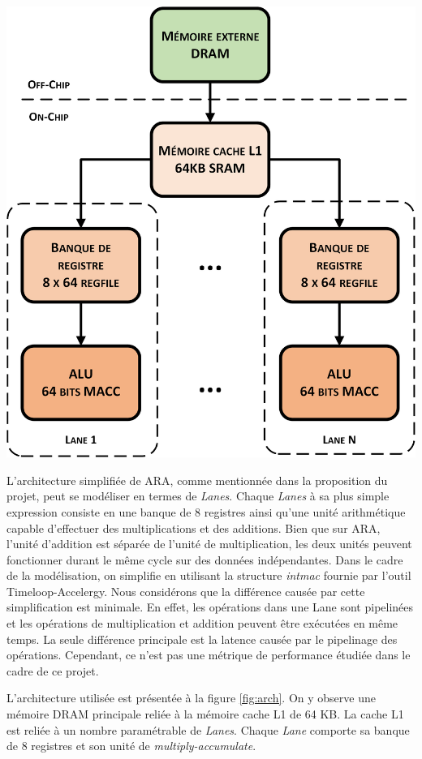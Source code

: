 \documentclass[10pt,letterpaper]{article}
\begin{document}
\begin{multicols}{2}
    {\centering
    \includegraphics[width=0.8\linewidth]{arch_visio.png}
    \label{fig:arch}}
    \bigskip

    L'architecture simplifiée de ARA, comme mentionnée dans la proposition du projet, peut se modéliser en termes de 
    \textit{Lanes}. Chaque \textit{Lanes} à sa plus simple expression consiste en une banque de 8 registres ainsi qu'une
    unité arithmétique capable d'effectuer des multiplications et des additions. Bien que sur ARA, l'unité d'addition 
    est séparée de l'unité de multiplication, les deux unités peuvent fonctionner durant le même cycle sur des données
    indépendantes. Dans le cadre de la modélisation, on simplifie en utilisant la structure \textit{intmac} fournie par
    l'outil Timeloop-Accelergy. Nous considérons que la différence causée par cette simplification est minimale. En effet,
    les opérations dans une Lane sont pipelinées et les opérations de multiplication et addition peuvent être exécutées en même temps.
    La seule différence principale est la latence causée par le pipelinage des opérations. Cependant, ce n'est pas une métrique
    de performance étudiée dans le cadre de ce projet.

    L'architecture utilisée est présentée à la figure \ref{fig:arch}. On y observe une mémoire DRAM principale reliée à 
    la mémoire cache L1 de 64 KB. La cache L1 est reliée à un nombre paramétrable de \textit{Lanes}. 
    Chaque \textit{Lane} comporte sa banque de 8 registres et son unité de \textit{multiply-accumulate}.


\end{multicols}
\end{document}
